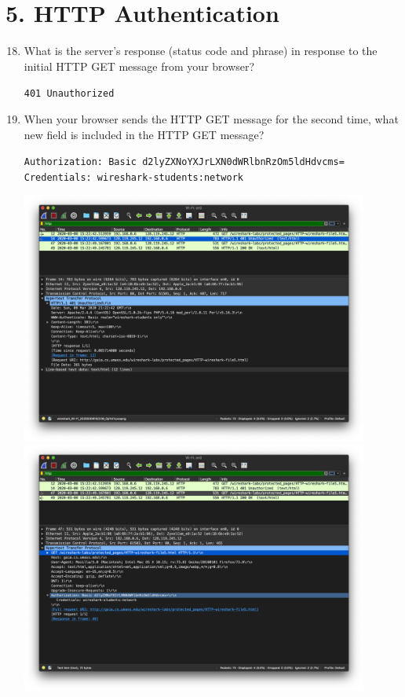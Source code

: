 \documentclass{article}
\begin{document}
\section*{5. HTTP Authentication}
\begin{enumerate}
\setcounter{enumi}{17}
\item What is the server’s response (status code and phrase) in response to the initial HTTP GET message from your browser?

\texttt{401 Unauthorized}

\item When your browser sends the HTTP GET message for the second time, what new field is included in the HTTP GET message?

\texttt{Authorization: Basic d2lyZXNoYXJrLXN0dWRlbnRzOm5ldHdvcms=}\\
\texttt{Credentials: wireshark-students:network}

\includegraphics[width=0.90\textwidth]{lab2_part5_get1}\\
\includegraphics[width=0.90\textwidth]{lab2_part5_get2}

\end{enumerate}
\end{document}
